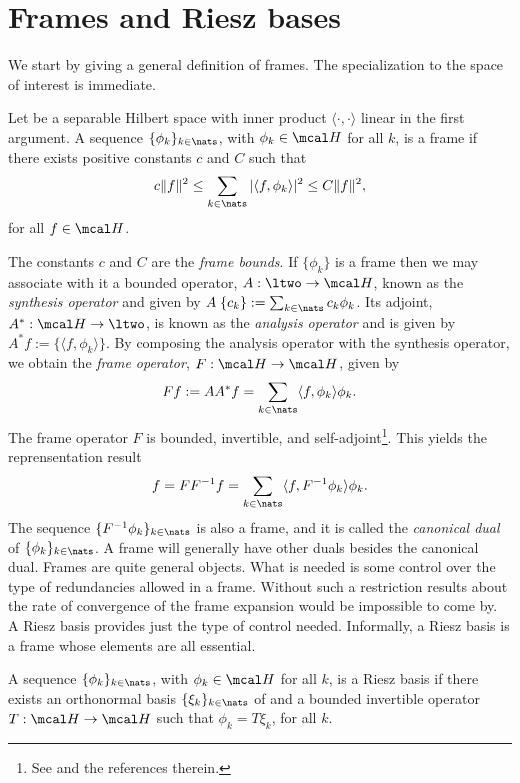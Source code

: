 \section{Frames and Riesz bases} We start by giving a general definition of frames. The specialization to the space of interest \Ltwo is immediate.
\begin{defn}
  Let \hs be a separable Hilbert space with inner product $\langle \cdot, \cdot\rangle$ linear in the first argument. A sequence $\{\phi_k\}_{k \in \nats}$, with $\phi_k \in \hs$ for all $k$, is a frame if there exists positive constants $c$ and $C$ such that
  \begin{align}
    c \Vert f \Vert^2 \le \sum_{k \in \nats}\vert \langle f, \phi_k\rangle \vert^2 \le  C \Vert f \Vert^2,
    \label{}
  \end{align}
  for all $f \in \hs$.
\end{defn}
\noindent The  constants $c$ and $C$ are  the  \emph{frame bounds}. If $\{\phi_k\}$ is a frame then we may associate with it a bounded operator, $A:\ltwo \to \hs$, known as the  \emph{synthesis operator} and  given by $A\;\{c_k\} := \sum_{k \in \nats} c_k \phi_k$.  Its adjoint, $A^*:\hs \to \ltwo$, is known as the \emph{analysis operator} and  is  given by $A^*f := \{\langle f, \phi_k \rangle\}$. By composing the analysis operator with the synthesis operator, we obtain the \emph{frame operator}, $F:\hs \to \hs$, given by 
\begin{align}
  F f := AA^*f = \sum_{k \in \nats} \langle f, \phi_k \rangle \phi_k. \notag
\end{align}
The frame operator $F$ is bounded, invertible, and self-adjoint\footnote{See \cite{Christensen2001} and the references therein.}. This yields the reprensentation result
\begin{align}
  f = FF^{-1}f = \sumn \langle f, F^{-1} \phi_k\rangle \phi_k.  
  \label{}
\end{align}
The sequence $\{F^{-1}\phi_k\}_{k \in \nats}$ is also a frame, and it is called the \emph{canonical dual} of $\{\phi_k\}_{k \in \nats}$. A frame will generally have other duals besides the canonical dual. Frames are quite general objects. What is needed is some control over the type of redundancies allowed in a frame. Without such a restriction results about the rate of convergence of the frame expansion would be impossible to come by. A Riesz basis provides just the type of control needed. Informally, a Riesz basis is a frame whose elements are all essential. 
\begin{defn}
  A sequence $\{\phi_k\}_{k \in \nats}$, with $\phi_k \in \hs$ for all $k$, is a Riesz basis  if there exists an orthonormal basis $\{\xi_k\}_{k \in \nats}$ of \hs and  a bounded invertible operator $T: \hs \to \hs$ such that $\phi_k = T \xi_k$, for all $k$. 
\end{defn}
